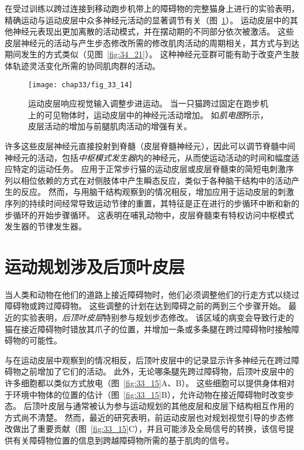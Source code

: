在受过训练以跨过连接到移动跑步机带上的障碍物的完整猫身上进行的实验表明，精确运动与运动皮层中众多神经元活动的显著调节有关（图~\ref{fig:33_14}）。
运动皮层中的其他神经元表现出更加离散的活动模式，并在摆动期的不同部分依次被激活。
这些皮层神经元的活动与产生步态修改所需的修改肌肉活动的周期相关，其方式与到达期间发生的方式类似（见图~\ref{fig:34_21}）。
这种神经元亚群可能有助于改变产生肢体轨迹灵活变化所需的协同肌肉群的活动。


\begin{figure}[htbp]
	\centering
	\texttt{[image: chap33/fig\_33\_14]}
	\caption{运动皮层响应视觉输入调整步进运动。
		当一只猫跨过固定在跑步机上的可见物体时，运动皮层中的神经元活动增加。
		如\textit{肌电图}所示，皮层活动的增加与前腿肌肉活动的增强有关\cite{drew1988motor}。}
	\label{fig:33_14}
\end{figure}


许多这些皮层神经元直接投射到脊髓（皮层脊髓神经元），因此可以调节脊髓中间神经元的活动，包括\textit{中枢模式发生器}内的神经元，从而使运动活动的时间和幅度适应特定的运动任务。
应用于正常步行猫的运动皮层或皮层脊髓束的简短电刺激序列以相位依赖的方式在对侧肢体中产生瞬态反应，类似于各种脑干结构中的活动产生的反应。
然而，与用脑干结构观察到的情况相反，增加应用于运动皮层的刺激序列的持续时间经常导致运动节律的重置，其特征是正在进行的步循环中断和新的步循环的开始步骤循环。
这表明在哺乳动物中，皮层脊髓束有特权访问中枢模式发生器的节律发生器。



\section{运动规划涉及后顶叶皮层}

当人类和动物在他们的道路上接近障碍物时，他们必须调整他们的行走方式以绕过障碍物或跨过障碍物。
这些调整的计划在达到障碍之前的两到三个步骤开始。
最近的实验表明，\textit{后顶叶皮层}特别参与规划步态修改。
该区域的病变会导致行走的猫在接近障碍物时错放其爪子的位置，并增加一条或多条腿在跨过障碍物时接触障碍物的可能性。


与在运动皮层中观察到的情况相反，后顶叶皮层中的记录显示许多神经元在跨过障碍物之前增加了它们的活动。
此外，无论哪条腿先跨过障碍物，后顶叶皮层中的许多细胞都以类似方式放电（图~\ref{fig:33_15}A、B）。
这些细胞可以提供身体相对于环境中物体的位置的估计（图~\ref{fig:33_15}B），允许动物在接近障碍物时改变步态。
后顶叶皮层与通常被认为参与运动规划的其他皮层和皮层下结构相互作用的方式尚不清楚。
然而，最近的研究表明，前运动皮层也对规划视觉引导的步态修改做出了重要贡献（图~\ref{fig:33_15}C），并且可能涉及全局信号的转换，该信号提供有关障碍物位置的信息到跨越障碍物所需的基于肌肉的信号。


